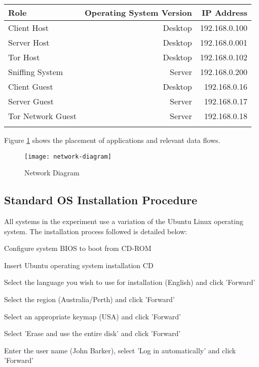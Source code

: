 \begin{tabular}{lrr}
  \toprule
  Role & Operating System Version & IP Address\\
  \midrule
  Client Host & Desktop & 192.168.0.100\\
  Server Host & Desktop & 192.168.0.001\\
  Tor Host & Desktop & 192.168.0.102\\
  \midrule
  Sniffing System & Server & 192.168.0.200\\
  \midrule
  Client Guest & Desktop & 192.168.0.16\\
  Server Guest & Server & 192.168.0.17\\
  Tor Network Guest & Server & 192.168.0.18\\
  \bottomrule
  \label{table:hosts}
\end{tabular}

Figure \ref{network-diagram} shows the placement of applications and relevant
data flows.

\begin{figure}[H]
  \centering\texttt{[image: network-diagram]}
  \caption{Network Diagram}
  \label{network-diagram}
\end{figure}

\subsection{Standard OS Installation Procedure}
\label{section:os_install}

All systems in the experiment use a variation of the Ubuntu Linux operating
system. The installation process followed is detailed below:

\begin{enumerate*}
  \item Configure system BIOS to boot from CD-ROM
  \item Insert Ubuntu operating system installation CD
  \item Select the language you wish to use for installation (English) and click
    'Forward'
  \item Select the region (Australia/Perth) and click 'Forward'
  \item Select an appropriate keymap (USA) and click 'Forward'
  \item Select 'Erase and use the entire disk' and click 'Forward'
  \item Enter the user name (John Barker), select 'Log in automatically' and click 'Forward'
\end{enumerate*}

